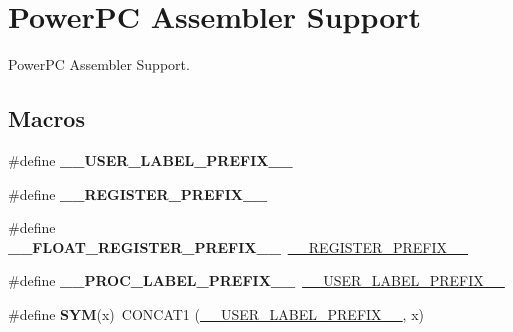 \hypertarget{group__RTEMSScoreCPUPowerPCASM}{}\section{Power\+PC Assembler Support}
\label{group__RTEMSScoreCPUPowerPCASM}


Power\+PC Assembler Support.  


\subsection*{Macros}
\begin{DoxyCompactItemize}
\item 
\mbox{\label{group__RTEMSScoreCPUPowerPCASM_gaff6bf0ff0fa3b5cbd23a8ae1131c87a9}} 
\#define {\bfseries \+\_\+\+\_\+\+U\+S\+E\+R\+\_\+\+L\+A\+B\+E\+L\+\_\+\+P\+R\+E\+F\+I\+X\+\_\+\+\_\+}
\item 
\mbox{\label{group__RTEMSScoreCPUPowerPCASM_ga08d4062230ffc8494f4be4f6447497e4}} 
\#define {\bfseries \+\_\+\+\_\+\+R\+E\+G\+I\+S\+T\+E\+R\+\_\+\+P\+R\+E\+F\+I\+X\+\_\+\+\_\+}
\item 
\mbox{\label{group__RTEMSScoreCPUPowerPCASM_ga06a4a79d9f3d21ef44ce0b187002204b}} 
\#define {\bfseries \+\_\+\+\_\+\+F\+L\+O\+A\+T\+\_\+\+R\+E\+G\+I\+S\+T\+E\+R\+\_\+\+P\+R\+E\+F\+I\+X\+\_\+\+\_\+}~\mbox{\hyperlink{group__RTEMSScoreCPUV850ASM_ga08d4062230ffc8494f4be4f6447497e4}{\+\_\+\+\_\+\+R\+E\+G\+I\+S\+T\+E\+R\+\_\+\+P\+R\+E\+F\+I\+X\+\_\+\+\_\+}}
\item 
\mbox{\label{group__RTEMSScoreCPUPowerPCASM_gabd8a24f3441d0ad54f9cd18106dfa666}} 
\#define {\bfseries \+\_\+\+\_\+\+P\+R\+O\+C\+\_\+\+L\+A\+B\+E\+L\+\_\+\+P\+R\+E\+F\+I\+X\+\_\+\+\_\+}~\mbox{\hyperlink{group__RTEMSScoreCPUx86-64ASM_gaff6bf0ff0fa3b5cbd23a8ae1131c87a9}{\+\_\+\+\_\+\+U\+S\+E\+R\+\_\+\+L\+A\+B\+E\+L\+\_\+\+P\+R\+E\+F\+I\+X\+\_\+\+\_\+}}
\item 
\mbox{\label{group__RTEMSScoreCPUPowerPCASM_gafe05d428a5f345f51fb591debb815325}} 
\#define {\bfseries S\+YM}(x)~C\+O\+N\+C\+A\+T1 (\mbox{\hyperlink{group__RTEMSScoreCPUx86-64ASM_gaff6bf0ff0fa3b5cbd23a8ae1131c87a9}{\+\_\+\+\_\+\+U\+S\+E\+R\+\_\+\+L\+A\+B\+E\+L\+\_\+\+P\+R\+E\+F\+I\+X\+\_\+\+\_\+}}, x)

\end{DoxyCompactItemize}
